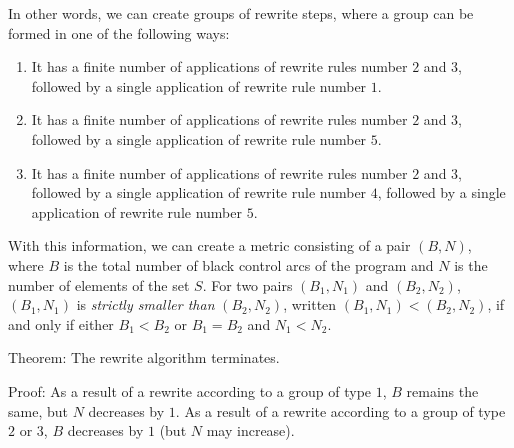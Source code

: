 In other words, we can create groups of rewrite steps, where a group
can be formed in one of the following ways:

\begin{enumerate}
\item It has a finite number of applications of rewrite rules number
  $2$ and $3$, followed by a single application of rewrite rule number
  $1$.
\item It has a finite number of applications of rewrite rules number
  $2$ and $3$, followed by a single application of rewrite rule number
  $5$.
\item It has a finite number of applications of rewrite rules number
  $2$ and $3$, followed by a single application of rewrite rule number
  $4$, followed by a single application of rewrite rule number $5$.
\end{enumerate}

With this information, we can create a metric consisting of a pair
$(B,N)$, where $B$ is the total number of black control arcs of the
program and $N$ is the number of elements of the set $S$.  For two
pairs $(B_1,N_1)$ and $(B_2,N_2)$, $(B_1,N_1)$ is \emph{strictly
  smaller than} $(B_2,N_2)$, written $(B_1,N_1) < (B_2,N_2)$, if and
only if either $B_1 < B_2$ or $B_1 = B_2$ and $N_1 < N_2$.

Theorem: The rewrite algorithm terminates.

Proof: As a result of a rewrite according to a group of type $1$, $B$
remains the same, but $N$ decreases by $1$.  As a result of a rewrite
according to a group of type $2$ or $3$, $B$ decreases by $1$ (but $N$
may increase).
